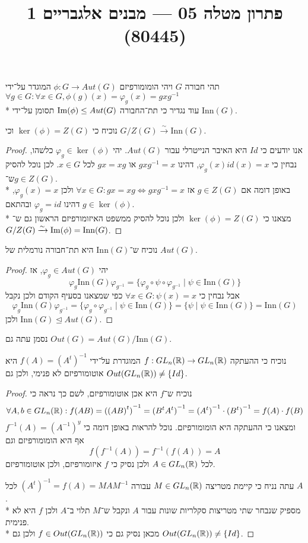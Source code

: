
\title{פתרון מטלה 05 --- מבנים אלגבריים 1 (80445)}


\maketitle
\maketitleprint{}

\Question{}
תהי חבורה $G$ ויהי הומומורפיזם $\phi : G \to Aut(G)$ המוגדר על־ידי $\forall g \in G : \forall x \in G, \phi(g)(x) = \varphi_g(x) = g x g^{-1}$ \\*
עוד נגדיר כי תת־החבורה $\operatorname{Im}(\phi) \le Aut(G)$ תסומן על־ידי $\text{Inn}(G)$.

\Subquestion{}
נוכיח כי $\ker(\phi) = Z(G)$ וכי $G/Z(G) \xrightarrow{\sim} \text{Inn}(G)$.
\begin{proof}
	אנו יודעים כי $Id$ היא האיבר הנייטרלי עבור $Aut(G)$.
	יהי $\varphi_g \in \ker(\phi)$ כלשהו, נבחין כי $\varphi_g(x) id(x) = x$, דהינו $g x g^{-1} = x$ או $gx = xg$ לכל $x \in G$.
	לכן נוכל להסיק ש־$g \in Z(G)$. \\*
	באופן דומה אם $g \in Z(G)$ אז $\forall x \in G : gx = xg \iff g x g^{-1} = x$ ולכן $\varphi_g(x) = x$, דהינו $\varphi_g = id$ ובהתאם $g \in \ker(\phi)$. \\*
	מצאנו כי $\ker(\phi) = Z(G)$ ולכן נוכל להסיק ממשפט האיזומורפיזם הראשון גם ש־$G/Z(G) \xrightarrow{\sim} \operatorname{Im}(\phi) = \text{Inn}(G)$.
\end{proof}

\Subquestion{}
נוכיח ש־$\text{Inn}(G)$ היא תת־חבורה נורמלית של $Aut(G)$.
\begin{proof}
	יהי $\varphi_g \in Aut(G)$, אז
	\[
		\varphi_g \text{Inn}(G) \varphi_{g^{-1}}
		= \{ \varphi_g \circ \psi \circ \varphi_{g^{-1}} \mid \psi \in \text{Inn}(G) \}
	\]
	אבל נבחין כי $\forall x \in G : \psi(x) = x$ כפי שמצאנו בסעיף הקודם ולכן נקבל
	\[
		\varphi_g \text{Inn}(G) \varphi_{g^{-1}}
		= \{ \varphi_g \circ \varphi_{g^{-1}} \mid \psi \in \text{Inn}(G) \}
		= \{ \psi \mid \psi \in \text{Inn}(G) \}
		= \text{Inn}(G)
	\]
	ולכן $\text{Inn}(G) \trianglelefteq Aut(G)$.
\end{proof}
נסמן עתה גם $Out(G) = Aut(G) / \text{Inn}(G)$.

\Subquestion{}
נוכיח כי ההעתקה $f : GL_n(\mathbb{R}) \to GL_n(\mathbb{R})$ המוגדרת על־ידי $f(A) = {(A^t)}^{-1}$ היא אוטומורפיזם לא פנימי, ולכן גם $Out(GL_n(\mathbb{R})) \ne \{ Id\}$.
\begin{proof}
	נוכיח ש־$f$ היא אכן אוטומורפיזם, לשם כך נראה כי
	\[
		\forall A, b \in GL_n(\mathbb{R}) : f(AB) = {({(AB)}^t)}^{-1} = {(B^t A^t)}^{-1} = {(A^t)}^{-1} \cdot {(B^t)}^{-1} = f(A) \cdot f(B)
	\]
	ומצאנו כי ההעתקה היא הומומורפיזם.
	נוכל להראות באופן דומה כי $f^{-1}(A) = {(A^{-1})}^y$ אף היא הומומורפיזם וגם
	\[
		f(f^{-1}(A)) = f^{-1}(f(A)) = A
	\]
	לכל $A \in GL_n(\mathbb{R})$ ולכן נסיק כי $f$ איזומורפיזם, ולכן אוטומורפיזם.

	עתה נניח כי קיימת מטריצה $M \in GL_n(\mathbb{R})$ עבורה ${(A^t)}^{-1} = f(A) = M A M^{-1}$ לכל $A$. \\*
	מספיק שנבחר שתי מטריצות סקלריות שונות עבור $A$ ונקבל ש־$M$ תלוי ב־$A$ ולכן $f$ היא לא פנימית. \\*
	מכאן נסיק גם כי $f \in Out(GL_n(\mathbb{R}))$ ולכן גם $Out(GL_n(\mathbb{R})) \ne \{ Id\}$.
\end{proof}

